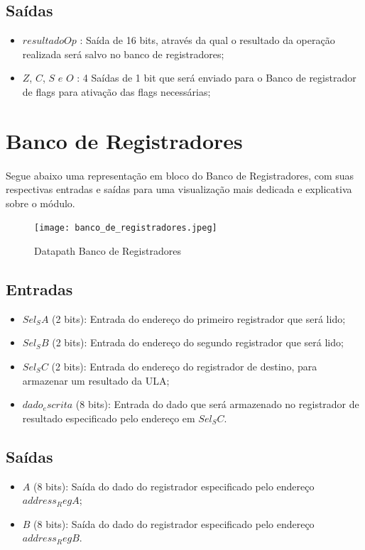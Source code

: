 \documentclass{report}
\begin{document}
    \subsection{Saídas}
\begin{itemize}
\item $resultadoOp$ : Saída de 16 bits, através da qual o resultado da operação realizada será salvo no banco de registradores;
\item $Z$, $C$, $S$ $e$ $O$ : 4 Saídas de 1 bit que será enviado para o Banco de registrador de flags para ativação das flags necessárias; 
\end{itemize}

    \section{Banco de Registradores}
    \paragraph{} 
    Segue abaixo uma representação em bloco do Banco de Registradores, com suas respectivas entradas e saídas para uma visualização mais dedicada e explicativa sobre o módulo. 
    
    \begin{figure}[H] \centering \texttt{[image: banco\_de\_registradores.jpeg]}                \caption{Datapath Banco de Registradores} \label{fig:mesh1} 
    \end{figure}
    \subsection{Entradas}
\begin{itemize}
        \item $Sel_SA$ (2 bits): Entrada do endereço do primeiro registrador que será lido;
		\item $Sel_SB$ (2 bits): Entrada do endereço do segundo registrador que será lido;
		\item $Sel_SC$ (2 bits): Entrada do endereço do registrador de destino, para 					armazenar um resultado da ULA;
		\item $dado_escrita$ (8 bits): Entrada do dado que será armazenado no registrador de 				resultado especificado pelo endereço em $Sel_SC$.
\end{itemize}

\subsection{Saídas}
\begin{itemize}
\item $A$ (8 bits): Saída do dado do registrador especificado pelo endereço $address_RegA$;
\item $B$ (8 bits): Saída do dado do registrador especificado pelo endereço $address_RegB$.
\end{itemize}
\end{document}
